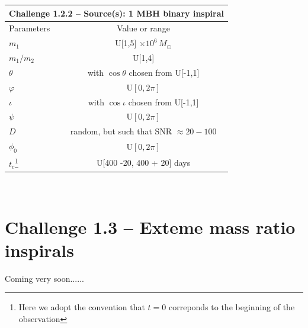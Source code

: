 \documentclass[11pt]{report}
\begin{document}
\begin{description}
\begin{center}
\begin{tabular}{l|c}
\hline \hline
\multicolumn{2}{c}{{\bf Challenge 1.2.2 -- Source(s): 1 MBH binary inspiral}} \\
\hline
Parameters & Value or range \\
\hline
$m_1$             & U[1,5] $\times 10^6\,M_\odot$ \\
$m_1/m_2$         & U[1,4] \\
$\theta$          & with $\cos\theta$ chosen from U[-1,1]\\
$\varphi$         & U$[0,2\pi]$ \\ 
$\iota$           & with $\cos\iota$ chosen from U[-1,1]\\ 
$\psi$            & U$[0,2\pi]$ \\
$D$               & random, but such that SNR $\approx 20-100$ \\
$\phi_0$          & U$[0,2\pi]$ \\
$t_c$\footnote{Here we adopt the convention that $t = 0$ correponds to the beginning of the observation}             & U[400 -20, 400 + 20] days \\
\hline \hline
\end{tabular} \\
\end{center}

\end{description}

\section{Challenge 1.3 -- Exteme mass ratio inspirals}

Coming very soon......

\begin{thebibliography}{}

\end{thebibliography}
\end{document}
